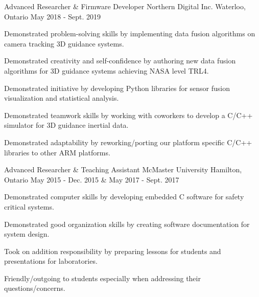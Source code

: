 
\begin{cventries}

  \cventry
    {Advanced Researcher \& Firmware Developer} %
    {Northern Digital Inc.} %
    {Waterloo, Ontario} %
    {May 2018 - Sept. 2019} %
    {
      \begin{cvitems} %
        \item {Demonstrated problem-solving skills by implementing data fusion algorithms on camera tracking 3D guidance systems.}
        \item {Demonstrated creativity and self-confidence by authoring new data fusion algorithms for 3D guidance systems achieving NASA level TRL4.}
        \item {Demonstrated initiative by developing Python libraries for sensor fusion visualization and statistical analysis.}
        \item {Demonstrated teamwork skills by working with coworkers to develop a C/C++ simulator for 3D guidance inertial data.}
        \item {Demonstrated adaptability by reworking/porting our platform specific C/C++ libraries to other ARM platforms.}
      \end{cvitems}
    }

  \cventry
    {Advanced Researcher \& Teaching Assistant} %
    {McMaster University} %
    {Hamilton, Ontario} %
    {May 2015 - Dec. 2015 \& May 2017 - Sept. 2017} %
    {
      \begin{cvitems} %
        \item {Demonstrated computer skills by developing embedded C software for safety critical systems.}
        \item {Demonstrated good organization skills by creating software documentation for system design.}
        \item {Took on addition responsibility by preparing lessons for students and presentations for laboratories.}
        \item {Friendly/outgoing to students especially when addressing their questions/concerns.}
      \end{cvitems}
    }


\end{cventries}
